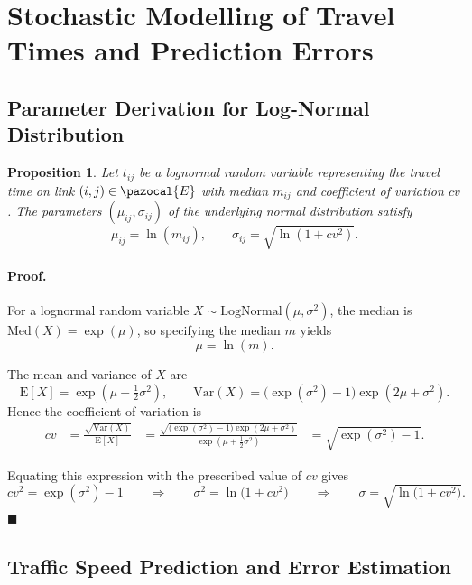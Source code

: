 \documentclass[a4paper,fleqn]{cas-sc}
\newtheorem{proposition}{Proposition}
\begin{document}
\section{Stochastic Modelling of Travel Times and Prediction Errors}

\subsection{Parameter Derivation for Log-Normal Distribution}\label{Appendix:log_normal}

\begin{proposition}
\label{prop:lognormal}
Let $t_{ij}$ be a lognormal random variable representing the travel time on link $(i,j)\in\pazocal{E}$ with median $m_{ij}$ and coefficient of 
variation $cv$. The parameters $(\mu_{ij},\sigma_{ij})$ of the underlying normal 
distribution satisfy
\[
    \mu_{ij} = \ln(m_{ij}), 
    \qquad
    \sigma_{ij} = \sqrt{\ln(1 + cv^{2})}.
\]
\end{proposition}

\paragraph{Proof.}
For a lognormal random variable $X \sim \mathrm{LogNormal}(\mu,\sigma^{2})$,  
the median is $\mathrm{Med}(X)=\exp(\mu)$, so specifying the median $m$ yields
\[
\mu = \ln(m).
\]

The mean and variance of $X$ are
\[
\mathrm{E}[X] = \exp\!\left(\mu + \tfrac{1}{2}\sigma^{2}\right),
\qquad
\mathrm{Var}(X) = \bigl(\exp(\sigma^{2}) - 1\bigr)\exp\!\left(2\mu + \sigma^{2}\right).
\]
Hence the coefficient of variation is
\[
\begin{aligned}
cv
&= \frac{\sqrt{\mathrm{Var}(X)}}{\mathrm{E}[X]}
&= \frac{\sqrt{\bigl(\exp(\sigma^{2}) - 1\bigr)\exp(2\mu + \sigma^{2})}}
        {\exp(\mu + \tfrac{1}{2}\sigma^{2})}
&= \sqrt{\exp(\sigma^{2}) - 1}.
\end{aligned}
\]

Equating this expression with the prescribed value of $cv$ gives
\[
cv^{2} = \exp(\sigma^{2}) - 1
\qquad\Longrightarrow\qquad
\sigma^{2} = \ln\!\bigl(1 + cv^{2}\bigr)
\qquad\Longrightarrow\qquad
\sigma = \sqrt{\ln\!\bigl(1 + cv^{2}\bigr)}.
\]
\hfill$\blacksquare$

\subsection{Traffic Speed Prediction and Error Estimation}\label{A2}
\end{document}
